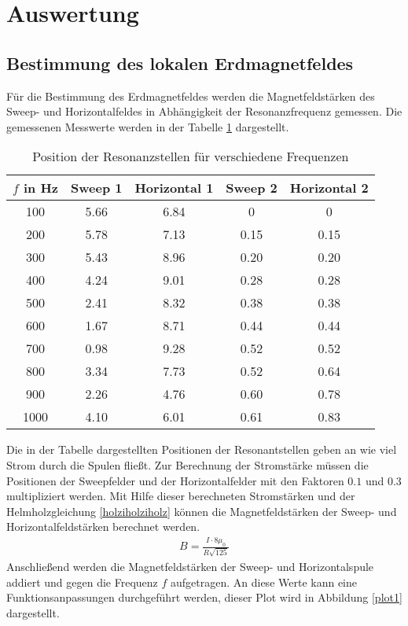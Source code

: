 \section{Auswertung}
\label{sec:Auswertung}
\subsection{Bestimmung des lokalen Erdmagnetfeldes}
Für die Bestimmung des Erdmagnetfeldes werden die Magnetfeldstärken des
Sweep- und Horizontalfeldes in Abhängigkeit der Resonanzfrequenz gemessen.
Die gemessenen Messwerte werden in der Tabelle \ref{tabmess1} dargestellt.
 \begin{table}
   \centering
   \caption{Position der Resonanzstellen für verschiedene Frequenzen}
   \label{tabmess1}
   \begin{tabular}{c|c|c|c|c}
     \toprule
    $f$ in Hz & Sweep 1& Horizontal 1 & Sweep 2&Horizontal 2 \\
     \midrule
     100 &  5.66 &  6.84  & 0   &   0   \\
     200 &  5.78 & 7.13  & 0.15 &  0.15  \\
     300 &  5.43 & 8.96  & 0.20 &  0.20 \\
     400 &  4.24 & 9.01  & 0.28 &  0.28 \\
     500 &  2.41 & 8.32  & 0.38 &  0.38 \\
     600 &  1.67 & 8.71  & 0.44 &  0.44 \\
     700 &  0.98 & 9.28  & 0.52 &  0.52 \\
     800 &  3.34 & 7.73  & 0.52 &  0.64 \\
     900 &  2.26 & 4.76  & 0.60 &  0.78 \\
     1000 & 4.10 & 6.01  & 0.61 &  0.83 \\
     \bottomrule
   \end{tabular}
 \end{table}
Die in der Tabelle dargestellten Positionen der Resonantstellen geben an wie
viel Strom durch die Spulen fließt. Zur Berechnung der Stromstärke müssen
die Positionen der Sweepfelder und der Horizontalfelder mit den Faktoren
$0.1$ und $0.3$ multipliziert werden. Mit Hilfe dieser berechneten Stromstärken
und der Helmholzgleichung \eqref{holziholziholz} können die Magnetfeldstärken der Sweep- und
Horizontalfeldstärken berechnet werden.
\begin{align}
\label{holziholziholz}
B=\frac{I\cdot 8\mu_0}{R\sqrt{125}}
\end{align}
Anschließend werden die Magnetfeldstärken der Sweep- und Horizontalspule addiert
und gegen die Frequenz $f$ aufgetragen. An diese Werte kann eine
Funktionsanpassungen durchgeführt werden, dieser Plot wird in Abbildung
\ref{plot1} dargestellt.

